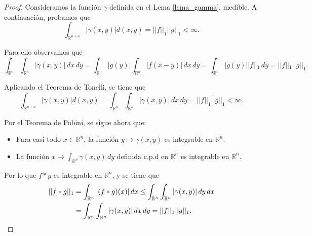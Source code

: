 \begin{proof}
    Consideramos la función $\gamma$ definida en el Lema \ref{lema_gamma}, medible.
    A continuación, probamos que 
    \begin{equation}
        \int_{\mathbb{R}^{n+n}} |\gamma(x,y)| d(x,y) = ||f||_1||g||_1 < \infty.
    \end{equation}

\noindent Para ello observamos que 
\begin{equation}
    \int_{\mathbb{R}^n}\int_{\mathbb{R}^n} |\gamma(x,y)| \, dx \, dy = \int_{\mathbb{R}^n} |g(y)|\int_{\mathbb{R}^n} |f(x-y)| \, dx \, dy  = \int_{\mathbb{R}^n} |g(y)||f||_1 \, dy  = ||f||_1||g||_1.
\end{equation}

\noindent Aplicando el Teorema de Tonelli, se tiene que 
\begin{equation}
        \int_{\mathbb{R}^{n+n}} |\gamma(x,y)| d(x,y) = \int_{\mathbb{R}^n}\int_{\mathbb{R}^n} |\gamma(x,y)| \, dx \, dy = ||f||_1||g||_1 < \infty.
\end{equation}

\noindent Por el Teorema de Fubini, se sigue ahora que:
\begin{itemize}
    \item Para casi todo $x \in \mathbb{R}^n$, la función $y \mapsto \gamma(x,y)$ es integrable en $\mathbb{R}^n$.

    \item La función $x \mapsto\int_{\mathbb{R}^n}\gamma(x,y) \, dy$ definida c.p.d en $\mathbb{R}^n$ es integrable en  $\mathbb{R}^n$.
\end{itemize}

\noindent Por lo que $f*g$ es integrable en $\mathbb{R}^n$, y se tiene que 
\begin{align}
||f*g||_1 &= \int_{\mathbb{R}^n}|(f*g)(x)| \, dx \leq \int_{\mathbb{R}^n}\int_{\mathbb{R}^n}|\gamma(x,y)|\, dy\, dx \\
&= \int_{\mathbb{R}^n}\int_{\mathbb{R}^n}|\gamma(x,y)|\, dx\, dy = ||f||_1||g||_1. \qedhere
\end{align}
\end{proof}


